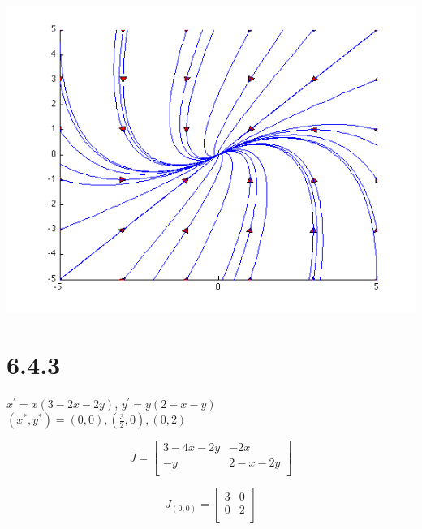 \documentclass[12pt]{article}
\begin{document}
\includegraphics[scale=.5]{6-3-6b.png}
\newpage
\section*{6.4.3}
\(x^{'} = x(3-2x-2y)\),
\(y ^{'} = y(2-x-y)\)\\
\((x^{*},y^{*}) = (0,0), (\frac{3}{2},0), (0,2)\)

\begin{displaymath}
  J = \left[
  \begin{array}{cc}
    3-4x-2y & -2x\\
    -y & 2-x-2y\\
    \end{array}
  \right]
\end{displaymath}

\begin{displaymath}
  J_{(0,0)} = \left[
  \begin{array}{cc}
    3 & 0\\
    0 & 2\\
    \end{array}
  \right]
\end{displaymath}
\end{document}
